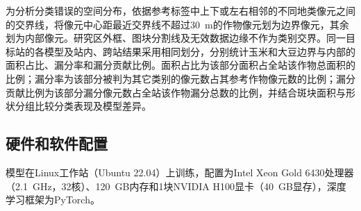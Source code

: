 为分析分类错误的空间分布，依据参考标签中上下或左右相邻的不同地类像元之间的交界线，将像元中心距最近交界线不超过30~m的作物像元划为边界像元，其余划为内部像元。研究区外框、图块分割线及无效数据边缘不作为类别交界。同一目标站的各模型及站内、跨站结果采用相同划分，分别统计玉米和大豆边界与内部的面积占比、漏分率和漏分贡献比例。面积占比为该部分面积占全站该作物总面积的比例；漏分率为该部分被判为其它类别的像元数占其参考作物像元数的比例；漏分贡献比例为该部分漏分像元数占全站该作物漏分总数的比例，并结合斑块面积与形状分组比较分类表现及模型差异。

\subsection{硬件和软件配置}

模型在Linux工作站（Ubuntu 22.04）上训练，配置为Intel Xeon Gold 6430处理器（2.1~GHz，32核）、120~GB内存和1块NVIDIA H100显卡（40~GB显存），深度学习框架为PyTorch。
